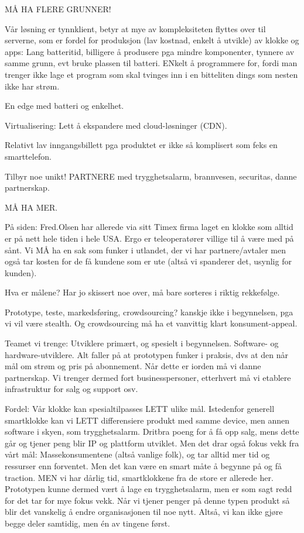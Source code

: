 MÅ HA FLERE GRUNNER!

Vår løsning er tynnklient, betyr at mye av kompleksiteten flyttes over til
serverne, som er fordel for produksjon (lav kostnad, enkelt å utvikle) av
klokke og apps: Lang batteritid, billigere å produsere pga mindre komponenter,
tynnere av samme grunn, evt bruke plassen til batteri. ENkelt å programmere
for, fordi man trenger ikke lage et program som skal tvinges inn i en
bitteliten dings som nesten ikke har strøm.

En edge med batteri og enkelhet.

Virtualisering: Lett å ekspandere med cloud-løsninger (CDN).


Relativt lav inngangsbillett pga produktet er ikke så komplisert som feks en
smarttelefon.

Tilbyr noe unikt! PARTNERE med trygghetsalarm, brannvesen, securitas, danne
partnerskap.

MÅ HA MER.

På siden:
Fred.Olsen har allerede via sitt Timex firma laget en klokke som alltid er på
nett hele tiden i hele USA. Ergo er teleoperatører villige til å være med på
sånt. Vi MÅ ha en sak som funker i utlandet, der vi har partnere/avtaler men
også tar kosten for de få kundene som er ute (altså vi spanderer det, usynlig
for kunden).


Hva er målene? Har jo skissert noe over, må bare sorteres i riktig rekkefølge.

Prototype, teste, markedsføring, crowdsourcing? kanskje ikke i begynnelsen, pga
vi vil være stealth. Og crowdsourcing må ha et vanvittig klart
konsument-appeal.

Teamet vi trenge: Utviklere primært, og spesielt i begynnelsen. Software- og
hardware-utviklere. Alt faller på at prototypen funker i praksis, dvs at den
når mål om strøm og pris på abonnement. Når dette er iorden må vi danne
partnerskap. Vi trenger dermed fort businesspersoner, etterhvert må vi etablere
infrastruktur for salg og support osv.

Fordel: Vår klokke kan spesialtilpasses LETT ulike mål. Istedenfor generell
smartklokke kan vi LETT differensiere produkt med samme device, men annen
software i skyen, som trygghetsalarm. Dritbra poeng for å få opp salg, mens
dette går og tjener peng blir IP og plattform utviklet. Men det drar også fokus
vekk fra vårt mål: Massekonsumentene (altså vanlige folk), og tar alltid mer
tid og ressurser enn forventet. Men det kan være en smart måte å begynne på og
få traction. MEN vi har dårlig tid, smartklokkene fra de store er allerede her.
Prototypen kunne dermed vært å lage en trygghetsalarm, men er som sagt redd for
det tar for mye fokus vekk. Når vi tjener penger på denne typen produkt så blir
det vanskelig å endre organisasjonen til noe nytt. Altså, vi kan ikke gjøre
begge deler samtidig, men én av tingene først.

